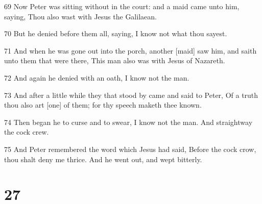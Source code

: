 \par 69 Now Peter was sitting without in the court: and a maid came unto him, saying, Thou also wast with Jesus the Galilaean.
\par 70 But he denied before them all, saying, I know not what thou sayest.
\par 71 And when he was gone out into the porch, another [maid] saw him, and saith unto them that were there, This man also was with Jesus of Nazareth.
\par 72 And again he denied with an oath, I know not the man.
\par 73 And after a little while they that stood by came and said to Peter, Of a truth thou also art [one] of them; for thy speech maketh thee known.
\par 74 Then began he to curse and to swear, I know not the man. And straightway the cock crew.
\par 75 And Peter remembered the word which Jesus had said, Before the cock crow, thou shalt deny me thrice. And he went out, and wept bitterly.

\chapter{27}

